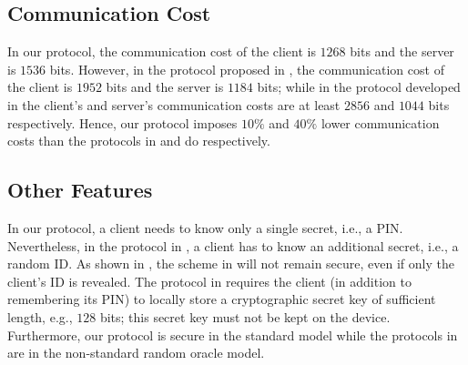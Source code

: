 \vspace{-4mm}
\subsection{Communication Cost}
\vspace{-2mm}

In our protocol, the communication cost of the client is $1268$ bits and the server is $1536$ bits. However, in the protocol proposed in \cite{WangW18},  the communication cost of the client is $1952$ bits and the server is  $1184$ bits; while in the protocol developed in \cite{JareckiJKSS21} the client's and server's communication costs are at least $2856$ and $1044$ bits respectively. Hence, our protocol imposes $10\%$ and $40\%$ lower communication costs than the protocols in \cite{WangW18} and \cite{JareckiJKSS21} do respectively.


\vspace{-4mm}
\subsection{Other Features}
\vspace{-2mm}
 In our protocol, a client needs to know only a single secret, i.e., a  PIN. Nevertheless, in the protocol in \cite{WangW18}, a client has to know an additional secret, i.e., a random ID. As shown in \cite{Scott12a}, the scheme in \cite{WangW18} will not remain secure, even if only the client's ID is revealed. The protocol in \cite{JareckiJKSS21} requires the client (in addition to remembering its PIN) to locally store a cryptographic secret key of sufficient length, e.g., $128$ bits; this secret key must not be kept on the device. 
 Furthermore, our protocol is secure in the standard model while the protocols in \cite{WangW18,JareckiJKSS21} are in the non-standard random oracle model. 

